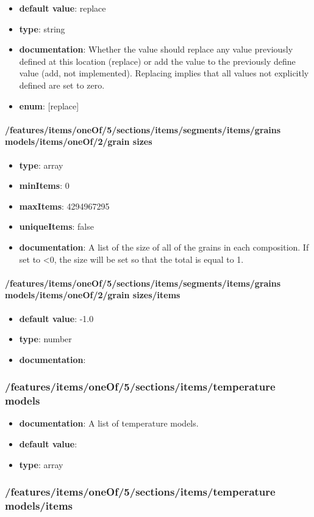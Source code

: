 \begin{itemize}\item {\bf default value}: replace
\item {\bf type}: string
\item {\bf documentation}: Whether the value should replace any value previously defined at this location (replace) or add the value to the previously define value (add, not implemented). Replacing implies that all values not explicitly defined are set to zero.
\item {\bf enum}: [replace]\end{itemize}\paragraph{/features/items/oneOf/5/sections/items/segments/items/grains models/items/oneOf/2/grain sizes}
\begin{itemize}\item {\bf type}: array
\item {\bf minItems}: 0
\item {\bf maxItems}: 4294967295
\item {\bf uniqueItems}: false
\item {\bf documentation}: A list of the size of all of the grains in each composition. If set to <0, the size will be set so that the total is equal to 1.
\end{itemize}\paragraph{/features/items/oneOf/5/sections/items/segments/items/grains models/items/oneOf/2/grain sizes/items}
\begin{itemize}\item {\bf default value}: -1.0
\item {\bf type}: number
\item {\bf documentation}: 
\end{itemize}\subsubsection{/features/items/oneOf/5/sections/items/temperature models}
\begin{itemize}\item {\bf documentation}: A list of temperature models.
\item {\bf default value}: 
\item {\bf type}: array
\end{itemize}\subsubsection{/features/items/oneOf/5/sections/items/temperature models/items}

